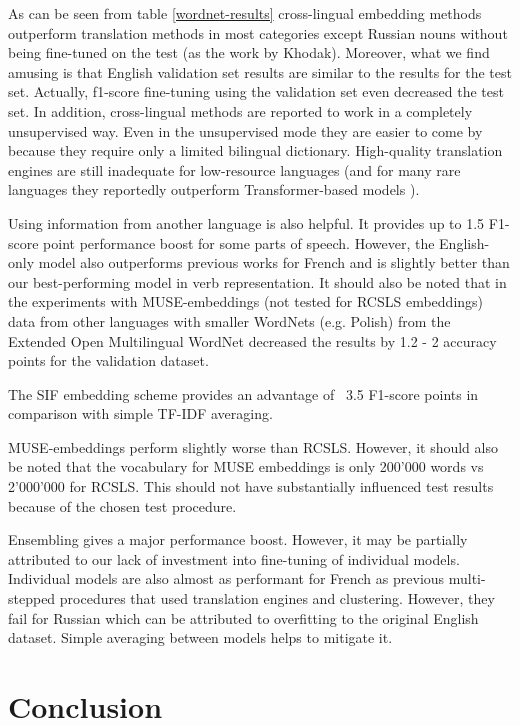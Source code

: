 \documentclass[11pt,a4paper]{article}
\begin{document}
As can be seen from table \ref{wordnet-results} cross-lingual embedding methods outperform translation methods in most categories except Russian nouns without being fine-tuned on the test (as the work by Khodak). Moreover, what we find amusing is that English validation set results are similar to the results for the test set. Actually, f1-score fine-tuning using the validation set even decreased the test set. In addition, cross-lingual methods are reported to work in a completely unsupervised way. Even in the unsupervised mode they are easier to come by because they require only a limited bilingual dictionary. High-quality translation engines are still inadequate for low-resource languages (and for many rare languages they reportedly outperform Transformer-based models \cite{laser}).

Using information from another language is also helpful. It provides up to 1.5 F1-score point performance boost for some parts of speech. However, the English-only model also outperforms previous works for French and is slightly better than our best-performing model in verb representation. It should also be noted that in the experiments with MUSE-embeddings (not tested for RCSLS embeddings) data from other languages with smaller WordNets (e.g. Polish) from the Extended Open Multilingual WordNet decreased the results by 1.2 - 2 accuracy points for the validation dataset.

The SIF embedding scheme provides an advantage of ~3.5 F1-score points in comparison with simple TF-IDF averaging.

MUSE-embeddings perform slightly worse than RCSLS. However, it should also be noted that the vocabulary for MUSE embeddings is only 200'000 words vs ~ 2'000'000 for RCSLS. This should not have substantially influenced test results because of the chosen test procedure.

Ensembling gives a major performance boost. However, it may be partially attributed to our lack of investment into fine-tuning of individual models. Individual models are also almost as performant for French as previous multi-stepped procedures that used translation engines and clustering. However, they fail for Russian which can be attributed to overfitting to the original English dataset. Simple averaging between models helps to mitigate it.

\section{Conclusion}
\end{document}
